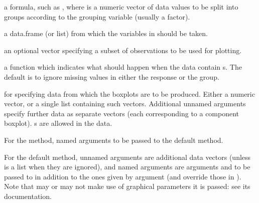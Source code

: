 \begin{Arguments}
\begin{ldescription}
\item[\code{formula}] a formula, such as , where  is a
numeric vector of data values to be split into groups according to
the grouping variable  (usually a factor).
\item[\code{data}] a data.frame (or list) from which the variables in
 should be taken.
\item[\code{subset}] an optional vector specifying a subset of observations
to be used for plotting.
\item[\code{na.action}] a function which indicates what should happen
when the data contain s.  The default is to ignore missing
values in either the response or the group.
\item[\code{x}] for specifying data from which the boxplots are to be
produced. Either a numeric vector, or a single list containing such
vectors. Additional unnamed arguments specify further data
as separate vectors (each corresponding to a component boxplot).
s are allowed in the data.
\item[\code{...}] For the  method, named arguments to be passed to
the default method.

For the default method, unnamed arguments are additional data
vectors (unless  is a list when they are ignored), and named
arguments are arguments and  to be passed
to  in addition to the ones given by argument
 (and override those in ). Note that
 may or may not make use of graphical parameters it is
passed: see its documentation.


\end{ldescription}
\end{Arguments}
